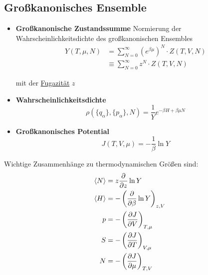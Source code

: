 \documentclass{article}
\newcommand{\lr}[1]{\left(#1\right)}
\begin{document}
\subsection{Großkanonisches Ensemble}
	\begin{itemize}
		\item \textbf{Großkanonische Zustandssumme}
		Normierung der Wahrscheinlichkeitsdichte des großkanonischen Ensembles
			\begin{align}
				Y(T, \mu, N) &= \sum_{N=0}^\infty (e^{\beta\mu})^N \cdot Z(T,V,N) \\
				&\equiv \sum_{N=0}^\infty z^N \cdot Z(T,V,N)
			\end{align}
		
		mit der \underline{Fugazität} $z$
		
		
		\item \textbf{Wahrscheinlichkeitsdichte}
			\begin{equation}
				\rho(\{q_\alpha\},\{p_\alpha\},N) = \frac{1}{Y} e^{-\beta H + \beta\mu N}
			\end{equation}
		
		
		\item \textbf{Großkanonisches Potential}
			\begin{equation}
				J(T,V,\mu) = -\frac{1}{\beta}\ln Y
			\end{equation}
	\end{itemize}

Wichtige Zusammenhänge zu thermodynamischen Größen sind:
	\begin{align}
		\braket{N} &= z \frac{\partial}{\partial z} \ln Y \\
		\braket{H} &= -\lr{ \frac{\partial}{\partial \beta} \ln Y }_{z,V} \\
		p &= -\lr{ \frac{\partial J}{\partial V} }_{T,\mu} \\
		S &= -\lr{ \frac{\partial J}{\partial T} }_{V,\mu} \\
		N &= -\lr{ \frac{\partial J}{\partial \mu} }_{T,V}
	\end{align}


\newpage
\end{document}

